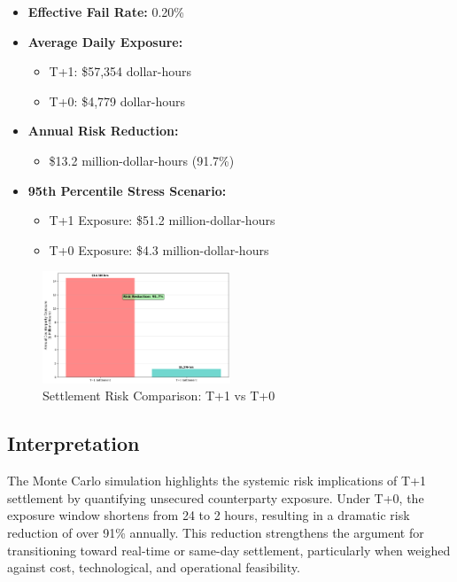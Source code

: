 \documentclass[conference]{IEEEtran}
\begin{document}
\begin{itemize}
    \item \textbf{Effective Fail Rate:} 0.20\%
    \item \textbf{Average Daily Exposure:} 
    \begin{itemize}
        \item T+1: \$57,354 dollar-hours
        \item T+0: \$4,779 dollar-hours
    \end{itemize}
    \item \textbf{Annual Risk Reduction:} 
    \begin{itemize}
        \item \$13.2 million-dollar-hours (91.7\%)
    \end{itemize}
    \item \textbf{95th Percentile Stress Scenario:} 
    \begin{itemize}
        \item T+1 Exposure: \$51.2 million-dollar-hours
        \item T+0 Exposure: \$4.3 million-dollar-hours
    \end{itemize}
\end{itemize}
\begin{figure}[H]
    \centering
    \includegraphics[width=0.5\textwidth]{output.png}
    \caption{Settlement Risk Comparison: T+1 vs T+0}
    \label{fig:settlement_timeline}
\end{figure}

\subsection{Interpretation}

The Monte Carlo simulation highlights the systemic risk implications of T+1 settlement by quantifying unsecured counterparty exposure. Under T+0, the exposure window shortens from 24 to 2 hours, resulting in a dramatic risk reduction of over 91\% annually. This reduction strengthens the argument for transitioning toward real-time or same-day settlement, particularly when weighed against cost, technological, and operational feasibility.
\end{document}
